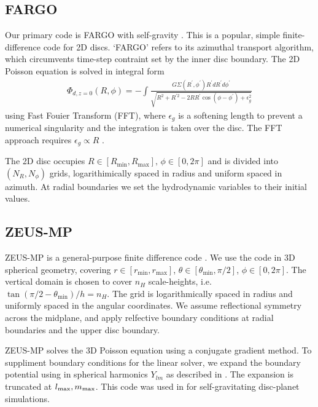 \subsection{FARGO}
Our primary code is FARGO with self-gravity \citep{baruteau08}. This
is a popular, simple finite-difference code for 2D discs. `FARGO' refers
to its azimuthal transport algorithm, which circumvents time-step
contraint set by the inner disc boundary. 
The 2D Poisson equation is solved in integral form 
\begin{align}\label{2d_grav}
  \Phi_{d,z=0}(R,\phi) = - \int
  \frac{G\Sigma(R^\prime,\phi^\prime)R^\prime dR^\prime d\phi^\prime}{\sqrt{R^2+R^{\prime 2} -
      2RR^\prime\cos{(\phi - \phi^\prime)} + \epsilon_g^2}} 
\end{align}
using Fast Fouier Transform (FFT), where $\epsilon_g$ is a softening
length to prevent a numerical singularity and the integration is taken
over the disc. The FFT approach requires
$\epsilon_g\propto R$ \citep{baruteau08}.  

The 2D disc occupies
$R\in[R_\mathrm{min},R_\mathrm{max}],\,\phi\in[0,2\pi]$ and is
divided into $(N_R,N_\phi)$ grids, logarithimically spaced in radius and
uniform spaced in azimuth. At radial boundaries we set the
hydrodynamic variables to their initial values.         

\subsection{ZEUS-MP}
ZEUS-MP  is a general-purpose finite difference
code \citep{hayes06}. We use the code in 3D spherical geometry, covering
$r\in[r_\mathrm{min},r_\mathrm{max}]$, $\theta\in[\theta_\mathrm{min},\pi/2]$,
$\phi\in[0,2\pi]$. The vertical domain is chosen to cover $n_H$
scale-heights, i.e. $\tan{(\pi/2 - \theta_\mathrm{min})}/h=n_H$. 
The grid is logarithmically spaced in radius and uniformly spaced in the angular
coordinates. We assume reflectional symmetry across the midplane, and
apply relfective boundary conditions at radial boundaries and the
upper disc boundary.  

ZEUS-MP solves the 3D Poisson equation using a conjugate gradient
method. To suppliment boundary conditions for the linear solver, we
expand the boundary potential using in spherical harmonics $Y_{lm}$ 
as described in \cite{boss80}. The expansion is truncated at
$l_\mathrm{max},m_\mathrm{max}$. This code was used in \cite{lin12b} for
self-gravitating disc-planet simulations.  

